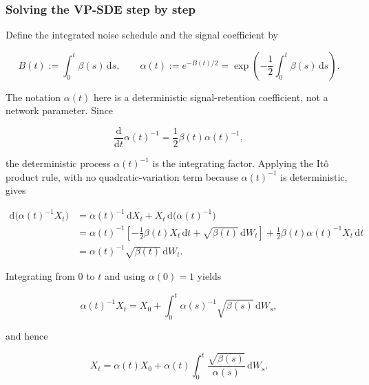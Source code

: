 \documentclass[11pt,a4paper]{article}
\theoremstyle{definition}
\begin{document}
\subsubsection{Solving the VP-SDE step by step}

Define the integrated noise schedule and the signal coefficient by

\[
B(t):=\int_0^t\beta(s)\,\mathrm{d}s,
\qquad
\alpha(t):=e^{-B(t)/2}
=\exp\left(-\frac12\int_0^t\beta(s)\,\mathrm{d}s\right).
\]

The notation $\alpha(t)$ here is a deterministic signal-retention coefficient, not a
network parameter. Since

\[
\frac{\mathrm{d}}{\mathrm{d}t}\alpha(t)^{-1}
=\frac12\beta(t)\alpha(t)^{-1},
\]

the deterministic process $\alpha(t)^{-1}$ is the integrating factor. Applying the It\^o
product rule, with no quadratic-variation term because $\alpha(t)^{-1}$ is deterministic,
gives

\[
\begin{aligned}
\mathrm{d}\bigl(\alpha(t)^{-1}X_t\bigr)
&=\alpha(t)^{-1}\,\mathrm{d}X_t
+X_t\,\mathrm{d}\bigl(\alpha(t)^{-1}\bigr) \\
&=\alpha(t)^{-1}
\left[-\frac12\beta(t)X_t\,\mathrm{d}t
+\sqrt{\beta(t)}\,\mathrm{d}W_t\right]
+\frac12\beta(t)\alpha(t)^{-1}X_t\,\mathrm{d}t \\
&=\alpha(t)^{-1}\sqrt{\beta(t)}\,\mathrm{d}W_t.
\end{aligned}
\]

Integrating from $0$ to $t$ and using $\alpha(0)=1$ yields

\[
\alpha(t)^{-1}X_t
=X_0+\int_0^t\alpha(s)^{-1}\sqrt{\beta(s)}\,\mathrm{d}W_s,
\]

and hence

\[
X_t
=\alpha(t)X_0
+\alpha(t)\int_0^t
\frac{\sqrt{\beta(s)}}{\alpha(s)}\,\mathrm{d}W_s.
\]
\end{document}
